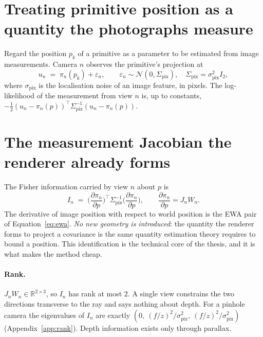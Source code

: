 \section{Treating primitive position as a quantity the photographs measure}
Regard the position $p_k$ of a primitive as a parameter to be estimated from
image measurements. Camera $n$ observes the primitive's projection at
\begin{equation}
  u_n \;=\; \pi_n(p_k) + \varepsilon_n,\qquad
  \varepsilon_n \sim \mathcal{N}(0,\Sigma_{\mathrm{pix}}),\quad
  \Sigma_{\mathrm{pix}} = \sigma_{\mathrm{pix}}^2 I_2 ,
  \label{eq:measurement}
\end{equation}
where $\sigma_{\mathrm{pix}}$ is the localisation noise of an image feature, in
pixels. The log-likelihood of the measurement from view $n$ is, up to constants,
$-\tfrac12 (u_n-\pi_n(p))^{\!\top}\Sigma_{\mathrm{pix}}^{-1}(u_n-\pi_n(p))$.

\section{The measurement Jacobian the renderer already forms}
\label{sec:jacobian}
The Fisher information carried by view $n$ about $p$ is
\begin{equation}
  I_n \;=\; \Big(\frac{\partial \pi_n}{\partial p}\Big)^{\!\top}
            \Sigma_{\mathrm{pix}}^{-1}
            \Big(\frac{\partial \pi_n}{\partial p}\Big),
  \qquad \frac{\partial \pi_n}{\partial p} = J_n W_n .
  \label{eq:fisher-view}
\end{equation}
The derivative of image position with respect to world position is the EWA pair
of Equation~\eqref{eq:ewa}. \emph{No new geometry is introduced}: the quantity
the renderer forms to project a covariance is the same quantity estimation
theory requires to bound a position. This identification is the technical core
of the thesis, and it is what makes the method cheap.

\paragraph{Rank.} $J_nW_n \in \mathbb{R}^{2\times3}$, so $I_n$ has rank at most
$2$. A single view constrains the two directions transverse to the ray and says
nothing about depth. For a pinhole camera the eigenvalues of $I_n$ are exactly
$(0,\ (f/z)^2/\sigma_{\mathrm{pix}}^2,\ (f/z)^2/\sigma_{\mathrm{pix}}^2)$
(Appendix~\ref{app:rank}). Depth information exists only through parallax.

